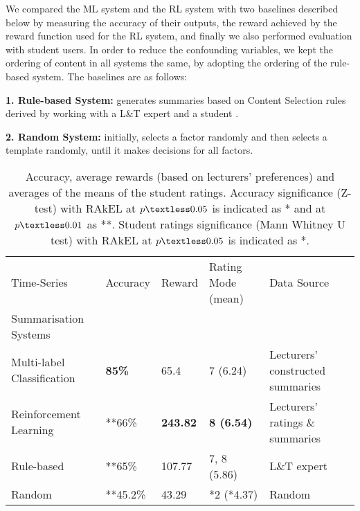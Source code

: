 \documentclass[11pt]{article}
\begin{document}
We compared the ML system and the RL system with two baselines
described below by measuring the accuracy of their outputs,
the reward achieved by the reward function used for the RL system, and 
finally we also performed evaluation with 
student users.  In order to reduce the confounding variables, we kept the ordering of content in all systems the same, 
by adopting the ordering of the rule-based system. The baselines are
as follows:

\textbf{1. Rule-based System:} generates summaries 
based on Content Selection rules derived by 
working with a L\&T expert and a student \cite{Gkatzia2013}. %

\textbf{2. Random System:} initially, selects a factor randomly and 
 then selects a template randomly, until it makes decisions for all factors. 

\begin{table*}[t]
\centering
\begin{tabular}{|l|l|l|l|l|}
 \hline
Time-Series & Accuracy & Reward & Rating Mode (mean) & Data Source \\
Summarisation Systems & & & &\\
\hline \hline
  Multi-label Classification & \textbf{85\%} &65.4 & 7 (6.24) & Lecturers' constructed summaries\\
  Reinforcement Learning & **66\% & \textbf{243.82} & \textbf{8 (6.54)} & Lecturers' ratings \& summaries\\
  Rule-based & **65\% &107.77 & 7, 8 (5.86) & L\&T expert\\
  Random & **45.2\% & 43.29 & *2 (*4.37) & Random \\
  \hline
\end{tabular}
\caption {Accuracy, average rewards (based on lecturers' preferences) and averages of the means of the student ratings. 
 Accuracy significance (Z-test) with RAkEL at $p\textless 0.05$ is indicated as *
 and at $p\textless 0.01$ as **. Student ratings significance (Mann Whitney U test) with RAkEL at $p\textless 0.05$ is indicated as *.}
 \label{tab:results}
\end{table*}
\end{document}

